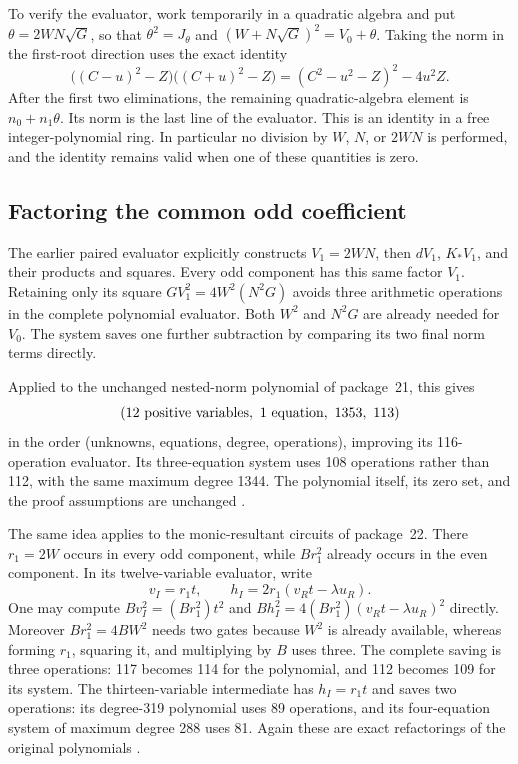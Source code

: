 To verify the evaluator, work temporarily in a quadratic algebra and put
$\theta=2WN\sqrt G$, so that $\theta^2=J_\theta$ and
$(W+N\sqrt G)^2=V_0+\theta$. Taking the norm in the first-root direction
uses the exact identity
\begin{equation}
 \bigl((C-u)^2-Z\bigr)\bigl((C+u)^2-Z\bigr)
   =(C^2-u^2-Z)^2-4u^2Z.
\label{eq:circuits-symmetric}
\end{equation}
After the first two eliminations, the remaining quadratic-algebra element
is $n_0+n_1\theta$. Its norm is the last line of the evaluator. This is an
identity in a free integer-polynomial ring. In particular no division by
$W$, $N$, or $2WN$ is performed, and the identity remains valid when one of
these quantities is zero.

\subsection{Factoring the common odd coefficient}

The earlier paired evaluator explicitly constructs $V_1=2WN$, then
$dV_1$, $K_*V_1$, and their products and squares. Every odd component has
this same factor $V_1$. Retaining only its square
$G V_1^2=4W^2(N^2G)$ avoids three arithmetic operations in the complete
polynomial evaluator. Both $W^2$ and $N^2G$ are already needed for $V_0$.
The system saves one further subtraction by comparing its two final norm
terms directly.

Applied to the unchanged nested-norm polynomial of package~21, this gives
\[
 (12\hbox{ positive variables},\ 1\hbox{ equation},\ 1353,\ 113)
\]
in the order (unknowns, equations, degree, operations), improving its
116-operation evaluator. Its three-equation system uses 108 operations
rather than 112, with the same maximum degree 1344. The polynomial itself,
its zero set, and the proof assumptions are unchanged \cite{repo21}.

The same idea applies to the monic-resultant circuits of package~22.
There $r_1=2W$ occurs in every odd component, while $Br_1^2$ already occurs
in the even component. In its twelve-variable evaluator, write
\[
 v_I=r_1t,\qquad
 h_I=2r_1(v_Rt-\lambda u_R).
\]
One may compute $Bv_I^2=(Br_1^2)t^2$ and
$Bh_I^2=4(Br_1^2)(v_Rt-\lambda u_R)^2$ directly. Moreover
$Br_1^2=4BW^2$ needs two gates because $W^2$ is already available,
whereas forming $r_1$, squaring it, and multiplying by $B$ uses three.
The complete saving is three operations: 117 becomes 114 for the
polynomial, and 112 becomes 109 for its system. The thirteen-variable
intermediate has $h_I=r_1t$ and saves two operations: its degree-319
polynomial uses 89 operations, and its four-equation system of maximum
degree 288 uses 81. Again these are exact refactorings of the original
polynomials \cite{repo22}.

